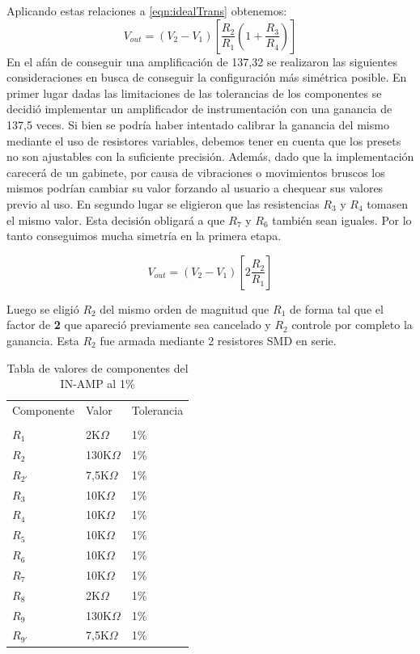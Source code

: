 	Aplicando estas relaciones a \eqref{eqn:idealTrans} obtenemos:
	\begin{equation}
		V_{out} = (V_2-V_1)\left[\frac{R_2}{R_1}(1+\frac{R_3}{R_4})\right]
	\end{equation}
En el afán de conseguir una amplificación de 137,32 se realizaron las siguientes consideraciones en busca de conseguir la configuración más simétrica posible.
En primer lugar dadas las limitaciones de las tolerancias de los componentes se decidió implementar un amplificador de instrumentación con una ganancia de 137,5 veces. Si bien se podría haber intentado calibrar la ganancia del mismo mediante el uso de resistores variables, debemos tener en cuenta que los presets no son ajustables con la suficiente precisión. Además, dado que la implementación carecerá de un gabinete, por causa de vibraciones o movimientos bruscos los mismos podrían cambiar su valor forzando al usuario a chequear sus valores previo al uso. 
En segundo lugar se eligieron que las resistencias $R_3$ y  $R_4$ tomasen el mismo valor. Esta decisión obligará a que $R_7$ y  $R_6$ también sean iguales. Por lo tanto conseguimos mucha simetría en la primera etapa.

\begin{equation}
	V_{out} = (V_2-V_1)\left[2 \frac{R_2}{R_1}\right]
\end{equation}

Luego se eligió $R_2$ del mismo orden de magnitud que $R_1$ de forma tal que el factor de \textbf{2} que apareció previamente sea cancelado y $R_2$ controle por completo la ganancia. Esta $R_2$ fue armada mediante 2 resistores SMD en serie.

\begin{table}[H]
	\centering
	\begin{tabular}{lll}
		Componente  & Valor        	   & Tolerancia \\
		\\
		$R_1$       & 2K$\Omega$   	   & 1\%        \\
		$R_2$       & 130K$\Omega$ 	   & 1\%        \\
		$R_{2'}$  	& 7,5K$\Omega$     & 1\%        \\
		$R_3$ 		& 10K$\Omega$      & 1\%		\\
		$R_4$		& 10K$\Omega$      & 1\%        \\
	    $R_5$		& 10K$\Omega$      & 1\%        \\
	    $R_6$		& 10K$\Omega$      & 1\%        \\
	    $R_7$		& 10K$\Omega$      & 1\%        \\
	    $R_8$		& 2K$\Omega$       & 1\%        \\
 	    $R_9$		& 130K$\Omega$     & 1\%        \\   
		$R_{9'}$	& 7,5K$\Omega$     & 1\%        \\
			\end{tabular}
		\caption{Tabla de valores de componentes del IN-AMP al 1\%}
\end{table}

